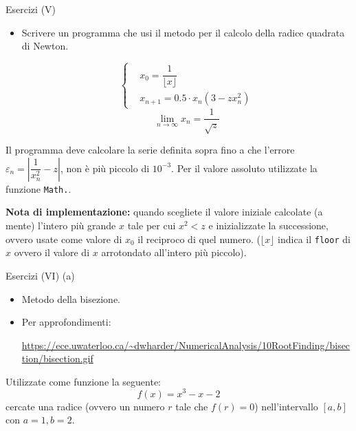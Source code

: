 \begin{frame}{Esercizi (V)}
  \begin{itemize}
    \item Scrivere un programma che usi il metodo per il calcolo della radice quadrata di Newton.
    
    \begin{equation*}
      \left\{\begin{aligned}
	  & x_0 = \dfrac{1}{\lfloor x \rfloor} \\
	  & x_{n +1} = 0.5 \cdot {x_n} (3  - zx^2_n)
      \end{aligned}\right.
    \end{equation*}
    \begin{equation*}
     \lim_{n \to \infty} x_{n} = \dfrac{1}{\sqrt{z}}
    \end{equation*}
  \end{itemize}
  
  Il programma deve calcolare la serie definita sopra fino a che l'errore
  $\varepsilon_{n} = \left|\dfrac{1}{x^{2}_{n}} - z\right|$,
  non è più piccolo di $10^{-3}$. Per il valore assoluto utilizzate la funzione \texttt{Math.}.

  \begin{scriptsize}
    \textbf{Nota di implementazione:} quando scegliete il valore iniziale calcolate (a mente) l'intero più grande $x$
    tale per cui $x^2 < z$ e inizializzate la successione, ovvero usate come valore di $x_0$ il reciproco di quel numero.
    (${\lfloor x \rfloor}$ indica il \texttt{floor} di $x$ ovvero il valore di $x$ arrotondato all'intero più piccolo).  
  \end{scriptsize}

  
\end{frame}

\begin{frame}{Esercizi (VI) (a)}
  \begin{itemize}
    \item Metodo della bisezione.
    \item Per approfondimenti:\newline
    \begin{scriptsize}
      \url{https://ece.uwaterloo.ca/~dwharder/NumericalAnalysis/10RootFinding/bisection/bisection.gif}
    \end{scriptsize}
  \end{itemize}

  Utilizzate come funzione la seguente:
  \begin{equation}
    f(x) = x^3 - x - 2
  \end{equation}
  cercate una radice (ovvero un numero $r$ tale che $f(r) = 0$) nell'intervallo $[a, b]$ con $a=1, b=2$.

\end{frame}

